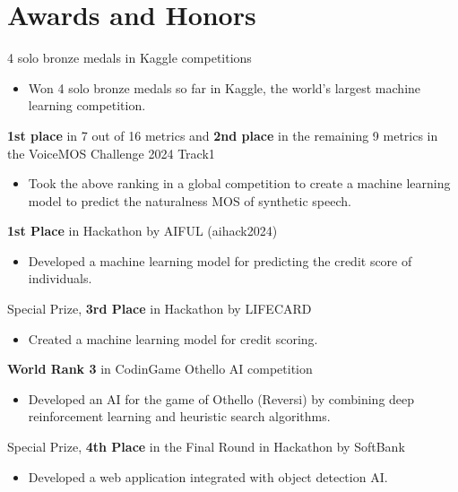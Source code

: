 \documentclass{article}
\begin{document}
\section{Awards and Honors}
\begin{description}[labelwidth=16mm, labelsep=1em, leftmargin=!, font=\normalfont]
  \item[--Aug. 2024] 4 solo bronze medals in Kaggle competitions
  \begin{itemize}[topsep=-2pt]
    \item Won 4 solo bronze medals so far in Kaggle, the world's largest machine learning competition.
  \end{itemize}
  \item[Jun. 2024] \textbf{1st place} in 7 out of 16 metrics and \textbf{2nd place} in the remaining 9 metrics in the VoiceMOS Challenge 2024 Track1
  \begin{itemize}[topsep=-2pt]
    \item Took the above ranking in a global competition to create a machine learning model to predict the naturalness MOS of synthetic speech.
  \end{itemize}
  \item[Mar. 2024] \textbf{1st Place} in  Hackathon by AIFUL (aihack2024)
  \begin{itemize}[topsep=-2pt]
    \item Developed a machine learning model for predicting the credit score of individuals.
  \end{itemize}
  \item[Oct. 2023] Special Prize, \textbf{3rd Place} in Hackathon by LIFECARD
  \begin{itemize}[topsep=-2pt]
    \item Created a machine learning model for credit scoring.
  \end{itemize}
  \item[Sep. 2023] \textbf{World Rank 3} in CodinGame Othello AI competition
  \begin{itemize}[topsep=-2pt]
    \item Developed an AI for the game of Othello (Reversi) by combining deep reinforcement learning and heuristic search algorithms.
  \end{itemize}
  \item[Mar. 2023] Special Prize, \textbf{4th Place} in the Final Round in Hackathon by SoftBank
  \begin{itemize}[topsep=-2pt]
    \item Developed a web application integrated with object detection AI.
  \end{itemize}
\end{description}
\end{document}
